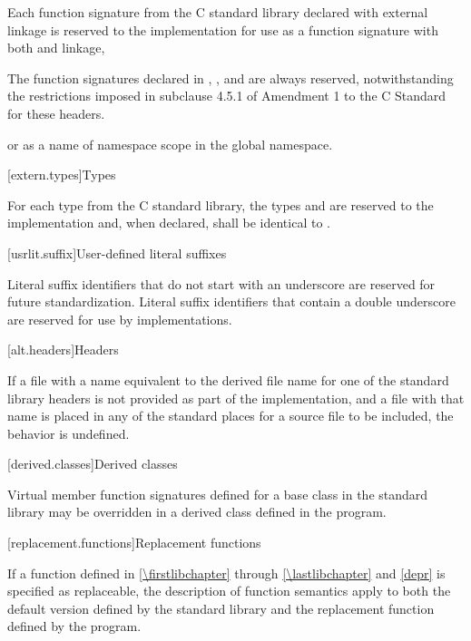 \pnum
Each function signature from the C standard library declared with
%
external linkage
is reserved to the implementation for use as
a function signature with both
%
and
%
linkage,
\begin{footnote}
The function signatures declared in
%
,
,
and
are always reserved, notwithstanding the restrictions imposed in subclause
4.5.1 of Amendment 1 to the C Standard for these headers.
\end{footnote}
or as a name of namespace scope in the global namespace.

[extern.types]{Types}

\pnum
For each type  from the C standard library,
the types
and
are reserved to the implementation and, when declared,
shall be identical to
.

[usrlit.suffix]{User-defined literal suffixes}

\pnum
Literal suffix identifiers that do not start with an underscore are reserved for future standardization.
Literal suffix identifiers that contain a double underscore
\tcode{\unun}
%
are reserved for use by \Cpp{} implementations.

[alt.headers]{Headers}

\pnum
If a file with a name
equivalent to the derived file name for one of the \Cpp{} standard library headers
is not provided as part of the implementation, and a file with that name
is placed in any of the standard places for a source file to be included,
the behavior is undefined.%
%

[derived.classes]{Derived classes}

\pnum
Virtual member function signatures defined
%
for a base class in the \Cpp{} standard
%
%
library may be overridden in a derived class defined in the program.

[replacement.functions]{Replacement functions}

\pnum
If a function defined in
\ref{\firstlibchapter} through \ref{\lastlibchapter} and \ref{depr}
is specified as replaceable,
the description of function semantics apply
to both the default version defined by the \Cpp{} standard library and
the replacement function defined by the program.


